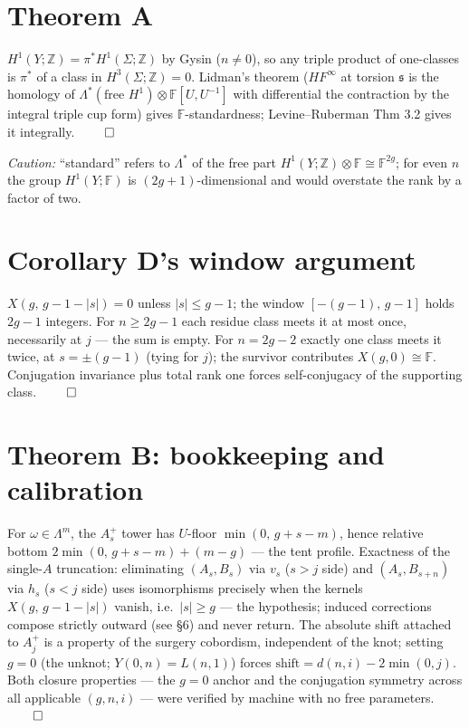 \documentclass[11pt,reqno]{amsart}
\newcommand{\F}{\mathbb{F}}
\newcommand{\Z}{\mathbb{Z}}
\newcommand{\HFinf}{\mathit{HF}^{\infty}}
\newcommand{\Sig}{\Sigma}
\newcommand{\Lam}{\Lambda}
\newcommand{\spinc}{\mathfrak{s}}
\theoremstyle{plain}
\begin{document}
\section{Theorem A}

$H^1(Y;\Z)=\pi^{*}H^1(\Sig;\Z)$ by Gysin ($n\ne 0$), so any triple product of one-classes is $\pi^{*}$ of a class in $H^3(\Sig;\Z)=0$. Lidman's theorem ($\HFinf$ at torsion $\spinc$ is the homology of $\Lam^{*}(\text{free }H^1)\otimes\F[U,U^{-1}]$ with differential the contraction by the integral triple cup form) gives $\F$-standardness; Levine--Ruberman Thm 3.2 gives it integrally. $\qed$

\smallskip
\noindent\emph{Caution:} ``standard'' refers to $\Lam^{*}$ of the free part $H^1(Y;\Z)\otimes\F\cong\F^{2g}$; for even $n$ the group $H^1(Y;\F)$ is $(2g+1)$-dimensional and would overstate the rank by a factor of two.

\section{Corollary D's window argument}

$X(g,\,g-1-|s|)=0$ unless $|s|\le g-1$; the window $[-(g-1),\,g-1]$ holds $2g-1$ integers. For $n\ge 2g-1$ each residue class meets it at most once, necessarily at $j$ --- the \cite[Thm~5.6]{OS08} sum is empty. For $n=2g-2$ exactly one class meets it twice, at $s=\pm(g-1)$ (tying for $j$); the survivor contributes $X(g,0)\cong\F$. Conjugation invariance plus total rank one forces self-conjugacy of the supporting class. $\qed$

\section{Theorem B: bookkeeping and calibration}

For $\omega\in\Lam^{m}$, the $A_s^{+}$ tower has $U$-floor $\min(0,\,g+s-m)$, hence relative bottom $2\min(0,\,g+s-m)+(m-g)$ --- the tent profile. Exactness of the single-$A$ truncation: eliminating $(A_s,B_s)$ via $v_s$ ($s>j$ side) and $(A_s,B_{s+n})$ via $h_s$ ($s<j$ side) uses isomorphisms precisely when the kernels $X(g,\,g-1-|s|)$ vanish, i.e.\ $|s|\ge g$ --- the hypothesis; induced corrections compose strictly outward (see \S6) and never return. The absolute shift attached to $A_j^{+}$ is a property of the surgery cobordism, independent of the knot; setting $g=0$ (the unknot; $Y(0,n)=L(n,1)$) forces $\text{shift}=d(n,i)-2\min(0,j)$. Both closure properties --- the $g=0$ anchor and the conjugation symmetry across all applicable $(g,n,i)$ --- were verified by machine with no free parameters. $\qed$
\end{document}

